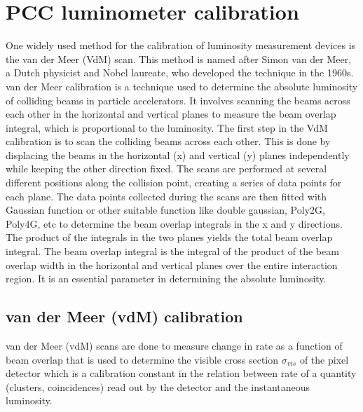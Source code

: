 \chapter{PCC luminometer calibration}  %

\ifpdf
    \graphicspath{{Chapter3/Figs/Raster/}{Chapter3/Figs/PDF/}{Chapter3/Figs/}}
\else
    \graphicspath{{Chapter3/Figs/Vector/}{Chapter3/Figs/}}
\fi


One widely used method for the calibration of luminosity measurement devices is the van der Meer (VdM) scan. This method is named after Simon van der Meer, a Dutch physicist and Nobel laureate, who developed the technique in the 1960s. van der Meer calibration is a technique used to determine the absolute luminosity of colliding beams in particle accelerators. It involves scanning the beams across each other in the horizontal and vertical planes to measure the beam overlap integral, which is proportional to the luminosity. The first step in the VdM calibration is to scan the colliding beams across each other. This is done by displacing the beams in the horizontal (x) and vertical (y) planes independently while keeping the other direction fixed. The scans are performed at several different positions along the collision point, creating a series of data points for each plane. The data points collected during the scans are then fitted with Gaussian function or other suitable function like double gaussian, Poly2G, Poly4G, etc to determine the beam overlap integrals in the x and y directions. The product of the integrals in the two planes yields the total beam overlap integral. %
The beam overlap integral is the integral of the product of the beam overlap width in the horizontal and vertical planes over the entire interaction region. It is an essential parameter in determining the absolute luminosity. 

\section{van der Meer (vdM) calibration}

van der Meer (vdM) scans are done to measure change in rate as a function of beam overlap that is used to determine the visible cross section $\sigma_{vis}$ of the pixel detector which is a calibration constant in the relation between rate of a quantity (clusters, coincidences) read out by the detector and the instantaneous luminosity. 


